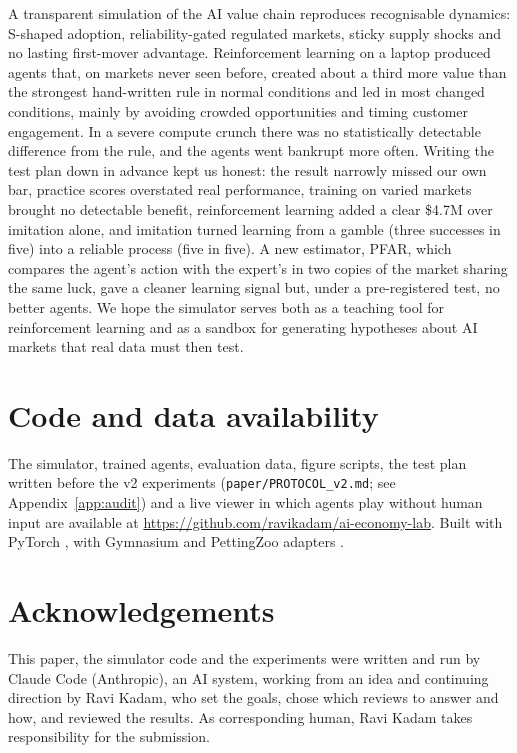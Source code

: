 \documentclass[11pt]{article}
\newif\ifaixiv \aixivtrue
\begin{document}
A transparent simulation of the AI value chain reproduces recognisable dynamics: S-shaped adoption, reliability-gated regulated markets, sticky supply shocks and no lasting first-mover advantage. Reinforcement learning on a laptop produced agents that, on markets never seen before, created about a third more value than the strongest hand-written rule in normal conditions and led in most changed conditions, mainly by avoiding crowded opportunities and timing customer engagement. In a severe compute crunch there was no statistically detectable difference from the rule, and the agents went bankrupt more often. Writing the test plan down in advance kept us honest: the result narrowly missed our own bar, practice scores overstated real performance, training on varied markets brought no detectable benefit, reinforcement learning added a clear \$4.7M over imitation alone, and imitation turned learning from a gamble (three successes in five) into a reliable process (five in five). A new estimator, PFAR, which compares the agent's action with the expert's in two copies of the market sharing the same luck, gave a cleaner learning signal but, under a pre-registered test, no better agents. We hope the simulator serves both as a teaching tool for reinforcement learning and as a sandbox for generating hypotheses about AI markets that real data must then test.

\section*{Code and data availability}
{\sloppy The simulator, trained agents, evaluation data, figure scripts, the test plan written before the v2 experiments (\texttt{paper/PROTOCOL\_v2.md}; see Appendix~\ref{app:audit}) and a live viewer in which agents play without human input are available at \url{https://github.com/ravikadam/ai-economy-lab}. Built with PyTorch \citep{paszke2019pytorch}, with Gymnasium and PettingZoo adapters \citep{towers2024gymnasium,terry2021pettingzoo}.\par}

\section*{Acknowledgements}
\ifaixiv
This paper, the simulator code and the experiments were written and run by Claude Code (Anthropic), an AI system, working from an idea and continuing direction by Ravi Kadam, who set the goals, chose which reviews to answer and how, and reviewed the results. As corresponding human, Ravi Kadam takes responsibility for the submission.
\else
The simulator code, experiments and drafting of this paper were carried out with substantial assistance from Claude (Anthropic), an AI system. The author designed the study, directed the work, and reviewed the results and text, and takes full responsibility for the content.
\fi
\end{document}
